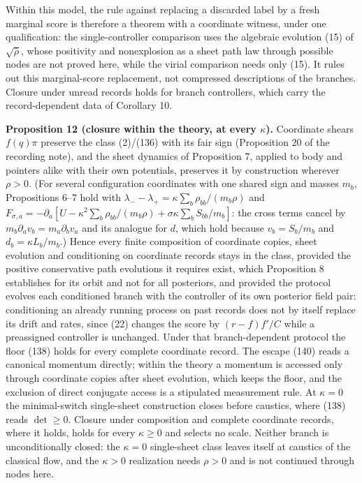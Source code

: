 \documentclass[11pt,a4paper]{article}
\begin{document}
Within this model, the rule against replacing a discarded label by a
fresh marginal score is therefore a theorem with a coordinate witness,
under one qualification: the single-controller comparison uses the
algebraic evolution (15) of \(\sqrt{\bar\rho}\), whose positivity and
nonexplosion as a sheet path law through possible nodes are not proved
here, while the virial comparison needs only (15). It rules out this
marginal-score replacement, not compressed descriptions of the branches.
Closure under unread records holds for branch controllers, which carry
the record-dependent data of Corollary 10.

\textbf{Proposition 12 (closure within the theory, at every
\(\kappa\)).} Coordinate shears \(f(q)\pi\) preserve the class (2)/(136)
with its fair sign (Proposition 20 of the recording note), and the sheet
dynamics of Proposition 7, applied to body and pointers alike with their
own potentials, preserves it by construction wherever \(\rho>0\). (For
several configuration coordinates with one shared sign and masses
\(m_b\), Propositions 6--7 hold with
\(\lambda_--\lambda_+=\kappa\sum_b\rho_{bb}/(m_b\rho)\) and
\(F_{\sigma,a}=-\partial_a[U-\kappa^2\sum_b\rho_{bb}/(m_b\rho) +\sigma\kappa\sum_bS_{bb}/m_b]\):
the cross terms cancel by \(m_b\partial_av_b=m_a\partial_bv_a\) and its
analogue for \(d\), which hold because \(v_b=S_b/m_b\) and
\(d_b=\kappa L_b/m_b\).) Hence every finite composition of coordinate
copies, sheet evolution and conditioning on coordinate records stays in
the class, provided the positive conservative path evolutions it
requires exist, which Proposition 8 establishes for its orbit and not
for all posteriors, and provided the protocol evolves each conditioned
branch with the controller of its own posterior field pair: conditioning
an already running process on past records does not by itself replace
its drift and rates, since (22) changes the score by \((r-f)f'/C\) while
a preassigned controller is unchanged. Under that branch-dependent
protocol the floor (138) holds for every complete coordinate record. The
escape (140) reads a canonical momentum directly; within the theory a
momentum is accessed only through coordinate copies after sheet
evolution, which keeps the floor, and the exclusion of direct conjugate
access is a stipulated measurement rule. At \(\kappa=0\) the
minimal-switch single-sheet construction closes before caustics, where
(138) reads \(\det\ge0\). Closure under composition and complete
coordinate records, where it holds, holds for every \(\kappa\ge0\) and
selects no scale. Neither branch is unconditionally closed: the
\(\kappa=0\) single-sheet class leaves itself at caustics of the
classical flow, and the \(\kappa>0\) realization needs \(\rho>0\) and is
not continued through nodes here.
\end{document}
